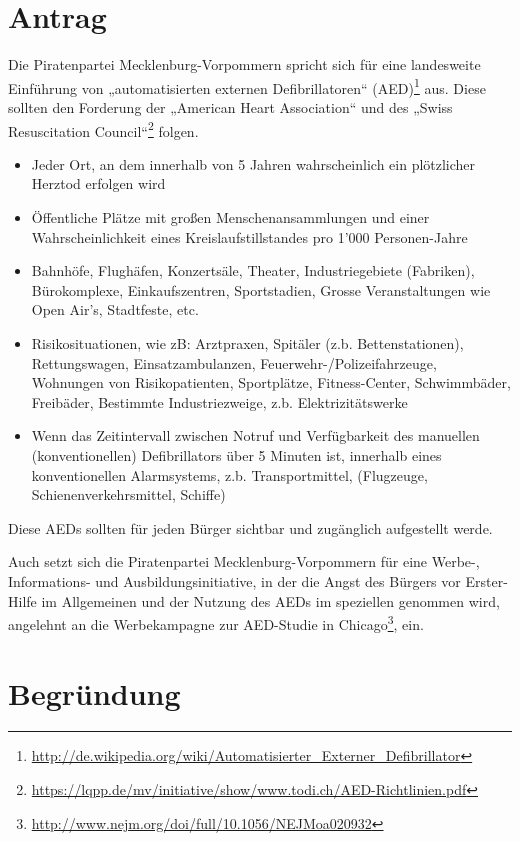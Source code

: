 \section{Antrag}

Die Piratenpartei Mecklenburg-Vorpommern spricht sich für eine landesweite Einführung von „automatisierten externen Defibrillatoren`` (AED)\footnote{\url{http://de.wikipedia.org/wiki/Automatisierter\_Externer\_Defibrillator}} aus. Diese sollten den Forderung der „American Heart Association`` und des „Swiss Resuscitation Council``\footnote{\url{https://lqpp.de/mv/initiative/show/www.todi.ch/AED-Richtlinien.pdf}} folgen.

\begin{itemize}
\item
  Jeder Ort, an dem innerhalb von 5 Jahren wahrscheinlich ein plötzlicher Herztod erfolgen wird
\item
  Öffentliche Plätze mit großen Menschenansammlungen und einer Wahrscheinlichkeit eines Kreislaufstillstandes pro 1'000 Personen-Jahre
\item
  Bahnhöfe, Flughäfen, Konzertsäle, Theater, Industriegebiete (Fabriken), Bürokomplexe, Einkaufszentren, Sportstadien, Grosse Veranstaltungen wie Open Air's, Stadtfeste, etc.
\item
  Risikosituationen, wie zB: Arztpraxen, Spitäler (z.b. Bettenstationen), Rettungswagen, Einsatzambulanzen, Feuerwehr-/Polizeifahrzeuge, Wohnungen von Risikopatienten, Sportplätze, Fitness-Center, Schwimmbäder, Freibäder, Bestimmte Industriezweige, z.b. Elektrizitätswerke
\item
  Wenn das Zeitintervall zwischen Notruf und Verfügbarkeit des manuellen (konventionellen) Defibrillators über 5 Minuten ist, innerhalb eines konventionellen Alarmsystems, z.b. Transportmittel, (Flugzeuge, Schienenverkehrsmittel, Schiffe)
\end{itemize}
Diese AEDs sollten für jeden Bürger sichtbar und zugänglich aufgestellt werde.

Auch setzt sich die Piratenpartei Mecklenburg-Vorpommern für eine Werbe-, Informations- und Ausbildungsinitiative, in der die Angst des Bürgers vor Erster-Hilfe im Allgemeinen und der Nutzung des AEDs im speziellen genommen wird, angelehnt an die Werbekampagne zur AED-Studie in Chicago\footnote{\url{http://www.nejm.org/doi/full/10.1056/NEJMoa020932}}, ein.

\section{Begründung}

